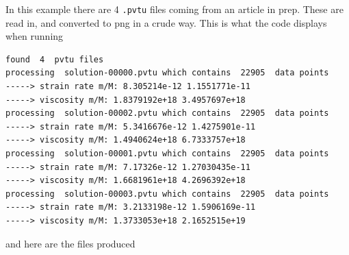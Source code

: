 In this example there are 4 {\tt .pvtu} files coming from an article in prep. 
These are read in, and converted to png in a crude way. 
This is what the code displays when running
\begin{verbatim}
found  4  pvtu files
processing  solution-00000.pvtu which contains  22905  data points
-----> strain rate m/M: 8.305214e-12 1.1551771e-11
-----> viscosity m/M: 1.8379192e+18 3.4957697e+18
processing  solution-00002.pvtu which contains  22905  data points
-----> strain rate m/M: 5.3416676e-12 1.4275901e-11
-----> viscosity m/M: 1.4940624e+18 6.7333757e+18
processing  solution-00001.pvtu which contains  22905  data points
-----> strain rate m/M: 7.17326e-12 1.27030435e-11
-----> viscosity m/M: 1.6681961e+18 4.2696392e+18
processing  solution-00003.pvtu which contains  22905  data points
-----> strain rate m/M: 3.2133198e-12 1.5906169e-11
-----> viscosity m/M: 1.3733053e+18 2.1652515e+19
\end{verbatim} 
and here are the files produced
